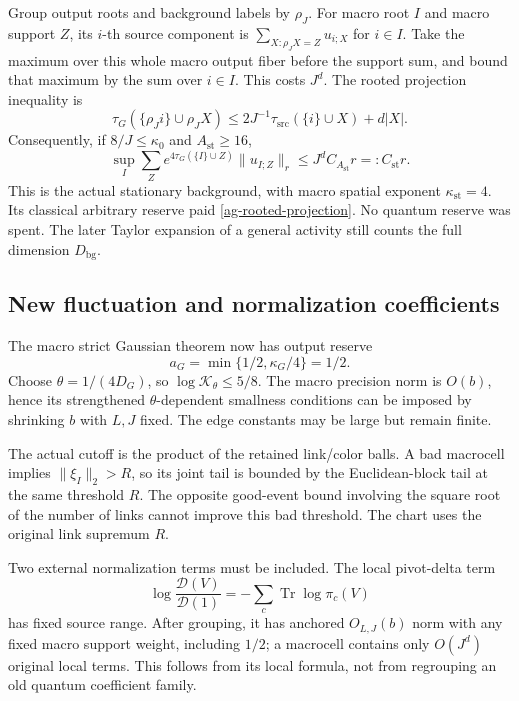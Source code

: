 Group output roots and background labels by $\rho_J$.
For macro root $I$ and macro support $Z$, its $i$-th
source component is $\sum_{X:\rho_JX=Z}u_{i;X}$ for $i\in I$.
Take the maximum over this whole macro output fiber before
the support sum, and bound that maximum by the sum over
$i\in I$. This costs $J^d$. The rooted projection inequality is
\begin{equation}\label{ag-rooted-projection}
 \tau_G(\{\rho_Ji\}\cup\rho_JX)
 \le2J^{-1}\tau_{\mathrm{src}}(\{i\}\cup X)+d|X|.
\end{equation}
Consequently, if $8/J\le\kappa_0$ and $A_{\mathrm{st}}\ge16$,
\begin{equation}\label{ag-macro-stationary}
 \sup_I\sum_Ze^{4\tau_G(\{I\}\cup Z)}\|u_{I;Z}\|_r
 \le J^d C_{A_{\mathrm{st}}}r=:C_{\mathrm{st}}r.
\end{equation}
This is the actual stationary background, with macro spatial
exponent $\kappa_{\mathrm{st}}=4$. Its classical arbitrary
reserve paid \eqref{ag-rooted-projection}. No quantum
reserve was spent. The later Taylor expansion of a general
activity still counts the full dimension $D_{\mathrm{bg}}$.

\subsection{New fluctuation and normalization coefficients}

The macro strict Gaussian theorem now has output reserve
\begin{equation}\label{ag-new-reserve}
 a_G=\min\{1/2,\kappa_G/4\}=1/2.
\end{equation}
Choose $\theta=1/(4D_G)$, so
$\log\mathcal K_\theta\le5/8$. The macro precision norm is
$O(b)$, hence its strengthened $\theta$-dependent smallness
conditions can be imposed by shrinking $b$ with $L,J$ fixed.
The edge constants may be large but remain finite.

The actual cutoff is the product of the retained link/color
balls. A bad macrocell implies $\|\xi_I\|_2>R$, so its joint
tail is bounded by the Euclidean-block tail at the same
threshold $R$. The opposite good-event bound involving the
square root of the number of links cannot improve this bad
threshold. The chart uses the original link supremum $R$.

Two external normalization terms must be included. The local
pivot-delta term
\[
 \log\frac{\mathcal D(V)}{\mathcal D(1)}
       =-\sum_c\operatorname{Tr}\log\pi_c(V)
\]
has fixed source range. After grouping, it has anchored
$O_{L,J}(b)$ norm with any fixed macro support weight,
including $1/2$; a macrocell contains only $O(J^d)$ original
local terms. This follows from its local formula, not from
regrouping an old quantum coefficient family.


